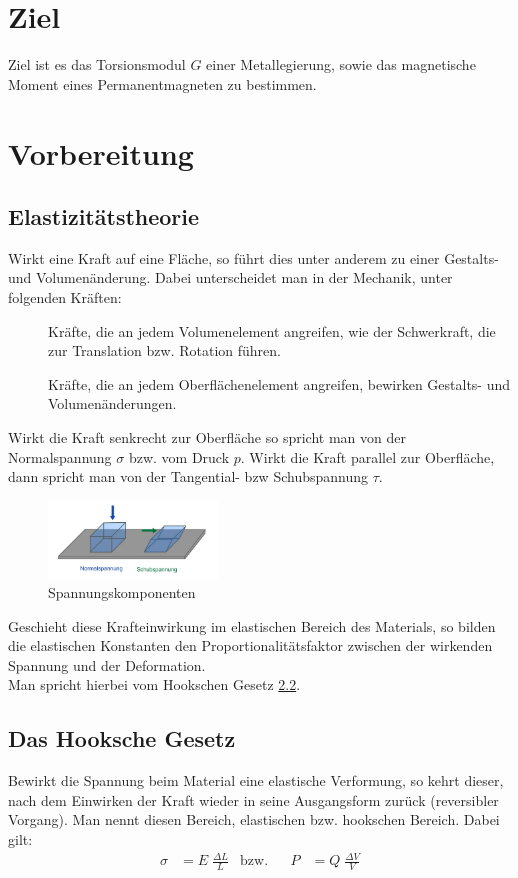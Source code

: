 \section{Ziel}
Ziel ist es das Torsionsmodul $G$ einer Metallegierung, sowie das magnetische Moment eines Permanentmagneten zu bestimmen.


\section{Vorbereitung}
\subsection{Elastizitätstheorie}
Wirkt eine Kraft auf eine Fläche, so führt dies unter anderem zu einer Gestalts- und Volumenänderung.
Dabei unterscheidet man in der Mechanik, unter folgenden Kräften:
\begin{description}
    \item[]
    Kräfte, die an jedem Volumenelement angreifen, wie der Schwerkraft, die zur Translation bzw. Rotation führen.
    \item[]
    Kräfte, die an jedem Oberflächenelement angreifen, bewirken Gestalts- und Volumenänderungen.
\end{description}

Wirkt die Kraft senkrecht zur Oberfläche so spricht man von der Normalspannung $\sigma$ bzw. vom Druck $p$. Wirkt die Kraft parallel zur Oberfläche,
dann spricht man von der Tangential- bzw Schubspannung $\tau$.
\begin{figure}[h]
  \centering
  \includegraphics[width=0.4\textwidth, height=0.2\textwidth]{bilder/Spannungkomponenten.jpg}
  \caption{Spannungskomponenten}
  \label{fig:Spannungkomponenten}
\end{figure}

Geschieht diese Krafteinwirkung im elastischen Bereich des Materials,
so bilden die elastischen Konstanten den Proportionalitätsfaktor zwischen der
wirkenden Spannung und der Deformation.\\
Man spricht hierbei vom Hookschen Gesetz \ref{sec:Hooksche_Gesetz}.

\subsection{Das Hooksche Gesetz}
\label{sec:Hooksche_Gesetz}
Bewirkt die Spannung beim Material eine elastische Verformung, so kehrt dieser, nach dem Einwirken 
der Kraft wieder in seine Ausgangsform zurück (reversibler Vorgang). Man nennt diesen Bereich, elastischen bzw. hookschen Bereich.
Dabei gilt:
\begin{align}
    \sigma &= E \; \frac{\Delta L}{L} & \mathrm{bzw.} & & P &=Q \;\frac{\Delta V}{V}
\end{align}
\label{eqn:def_hooksche}
\newpage

